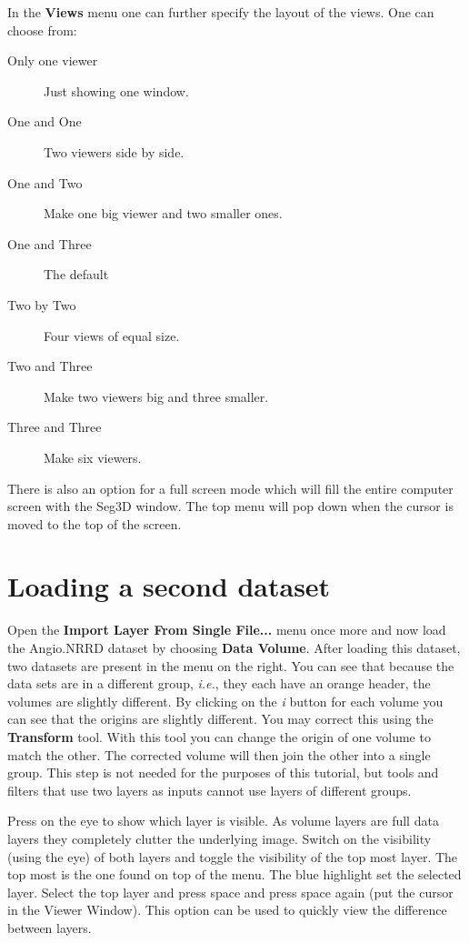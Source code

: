 \documentclass[fleqn,11pt,openany]{book}
\begin{document}
In the {\bf Views} menu one can further specify the layout of the views. One can choose from:

\begin{description}
\item[Only one viewer] Just showing one window.
\item[One and One] Two viewers side by side.
\item[One and Two] Make one big viewer and two smaller ones.
\item[One and Three] The default
\item[Two by Two]  Four views of equal size.
\item[Two and Three] Make two viewers big and three smaller.
\item[Three and Three] Make six viewers.
\end{description}


There is also an option for a full screen mode which will fill the entire computer screen with the Seg3D window. The top menu will pop down when the cursor is moved to the top of the screen.

\section{Loading a second dataset}

Open the {\bf Import Layer From Single File...} menu once more and now load the Angio.NRRD dataset by choosing \textbf {Data Volume}.
After loading this dataset, two datasets are present in the menu on the right.  You can see that because the data sets are in a different group, \emph{i.e.}, they each have an orange header, the volumes are slightly different.  By clicking on the \emph{i} button for each volume you can see that the origins are slightly different.  You may correct this using the {\bf Transform} tool.  With this tool you can change the origin of one volume to match the other. The corrected volume will then join the other into a single group. This step is not needed for  the purposes of this tutorial, but tools and filters that use two layers as inputs cannot use layers of different groups.  

Press on the eye to show which layer is visible. As volume layers are full data layers they completely clutter the underlying image.
Switch on the visibility (using the eye) of both layers and toggle the visibility of the top most layer.  The top most is the one found on top of the menu. 
The blue highlight set the selected layer.  Select the top layer and press space and press space again (put the cursor in the Viewer Window).
This option can be used to quickly view the difference between layers.
\end{document}
